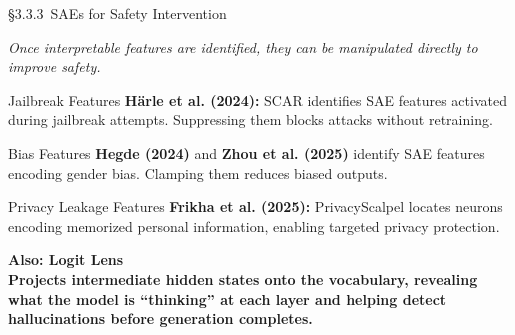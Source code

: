 \begin{frame}{\S3.3.3\ SAEs for Safety Intervention}

{\footnotesize\itshape
Once interpretable features are identified, they can be manipulated directly
to improve safety.
}

\vspace{0.3em}

\begin{ucrcard}[UCRnavy]{Jailbreak Features}
\scriptsize
\textbf{Härle et al. (2024):}
SCAR identifies SAE features activated during jailbreak attempts.
Suppressing them blocks attacks without retraining.
\end{ucrcard}

\vspace{0.15em}

\begin{ucrcard}[UCRnavy]{Bias Features}
\scriptsize
\textbf{Hegde (2024)} and \textbf{Zhou et al. (2025)}
identify SAE features encoding gender bias.
Clamping them reduces biased outputs.
\end{ucrcard}

\vspace{0.15em}

\begin{ucrcard}[UCRnavy]{Privacy Leakage Features}
\scriptsize
\textbf{Frikha et al. (2025):}
PrivacyScalpel locates neurons encoding memorized personal information,
enabling targeted privacy protection.
\end{ucrcard}

\vspace{0.15em}

\begin{ucrinfo}
\scriptsize\bfseries Also: Logit Lens\\[2pt]

\scriptsize
Projects intermediate hidden states onto the vocabulary,
revealing what the model is ``thinking'' at each layer and
helping detect hallucinations before generation completes.
\end{ucrinfo}

\end{frame}

